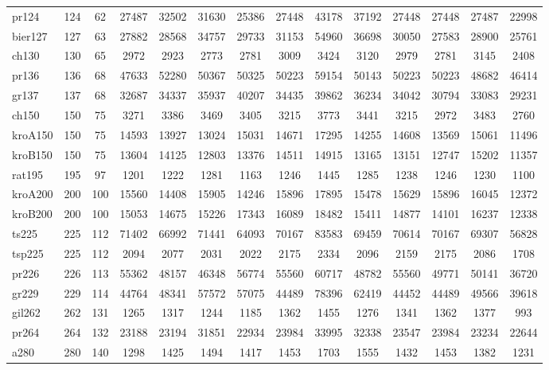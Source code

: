\documentclass[conference]{IEEEtran}
\begin{document}
\begin{table}[htbp]
{{\begin{tabular}{|l|c|c|c|c|c|c|c|c|c|c|c|c|c|}
pr124 & 124 & 62 & 27487 & 32502 & 31630 & 25386 & 27448 & 43178 & 37192 & 27448 & 27448 & 27487 & 22998 \\
bier127 & 127 & 63 & 27882 & 28568 & 34757 & 29733 & 31153 & 54960 & 36698 & 30050 & 27583 & 28900 & 25761 \\
ch130 & 130 & 65 & 2972 & 2923 & 2773 & 2781 & 3009 & 3424 & 3120 & 2979 & 2781 & 3145 & 2408 \\
pr136 & 136 & 68 & 47633 & 52280 & 50367 & 50325 & 50223 & 59154 & 50143 & 50223 & 50223 & 48682 & 46414 \\
gr137 & 137 & 68 & 32687 & 34337 & 35937 & 40207 & 34435 & 39862 & 36234 & 34042 & 30794 & 33083 & 29231 \\
ch150 & 150 & 75 & 3271 & 3386 & 3469 & 3405 & 3215 & 3773 & 3441 & 3215 & 2972 & 3483 & 2760 \\
kroA150 & 150 & 75 & 14593 & 13927 & 13024 & 15031 & 14671 & 17295 & 14255 & 14608 & 13569 & 15061 & 11496 \\
kroB150 & 150 & 75 & 13604 & 14125 & 12803 & 13376 & 14511 & 14915 & 13165 & 13151 & 12747 & 15202 & 11357 \\
rat195 & 195 & 97 & 1201 & 1222 & 1281 & 1163 & 1246 & 1445 & 1285 & 1238 & 1246 & 1230 & 1100 \\
kroA200 & 200 & 100 & 15560 & 14408 & 15905 & 14246 & 15896 & 17895 & 15478 & 15629 & 15896 & 16045 & 12372 \\
kroB200 & 200 & 100 & 15053 & 14675 & 15226 & 17343 & 16089 & 18482 & 15411 & 14877 & 14101 & 16237 & 12338 \\
ts225 & 225 & 112 & 71402 & 66992 & 71441 & 64093 & 70167 & 83583 & 69459 & 70614 & 70167 & 69307 & 56828 \\
tsp225 & 225 & 112 & 2094 & 2077 & 2031 & 2022 & 2175 & 2334 & 2096 & 2159 & 2175 & 2086 & 1708 \\
pr226 & 226 & 113 & 55362 & 48157 & 46348 & 56774 & 55560 & 60717 & 48782 & 55560 & 49771 & 50141 & 36720 \\
gr229 & 229 & 114 & 44764 & 48341 & 57572 & 57075 & 44489 & 78396 & 62419 & 44452 & 44489 & 49566 & 39618 \\
gil262 & 262 & 131 & 1265 & 1317 & 1244 & 1185 & 1362 & 1455 & 1276 & 1341 & 1362 & 1377 & 993 \\
pr264 & 264 & 132 & 23188 & 23194 & 31851 & 22934 & 23984 & 33995 & 32338 & 23547 & 23984 & 23234 & 22644 \\
a280 & 280 & 140 & 1298 & 1425 & 1494 & 1417 & 1453 & 1703 & 1555 & 1432 & 1453 & 1382 & 1231 \\

\end{tabular}}}
\end{table}
\end{document}
